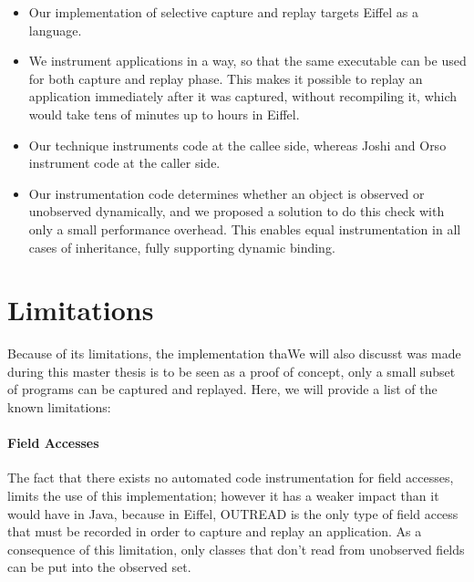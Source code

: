 \begin{itemize}
\item Our implementation of selective capture and replay targets Eiffel as a language.
\item We instrument applications in a way, so that the same executable can be used for both capture and replay phase. This makes it possible to replay an application immediately after it was captured, without recompiling it, which would take tens of minutes up to hours in Eiffel.
\item Our technique instruments code at the callee side, whereas Joshi and Orso instrument code at the caller side. 
\item Our instrumentation code determines whether an object is observed or unobserved dynamically, and we proposed a solution to do this check with only a small performance overhead. This enables equal instrumentation in all cases of inheritance, fully supporting dynamic binding. 
\end {itemize}

\section {Limitations}
Because of its limitations, the implementation thaWe will also discusst was made during this master thesis is to be seen as a proof of concept, only a small subset of programs can be captured and replayed. Here, we will provide a list of the known limitations:

\paragraph{Field Accesses}
The fact that there exists no automated code instrumentation for field accesses, limits the use of this implementation; however it has a weaker impact than it would have in Java, because in Eiffel, OUTREAD is the only type of field access that must be recorded in order to capture and replay an application. As a consequence of this limitation, only classes that don't read from unobserved fields can be put into the observed set.

